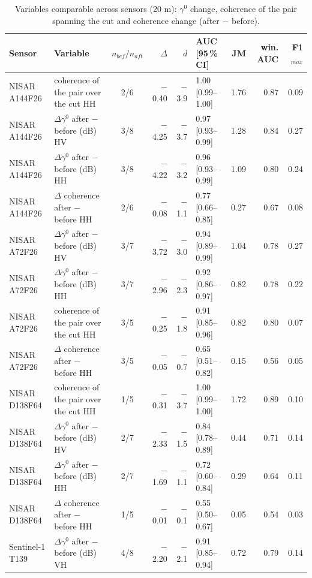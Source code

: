 \begin{table}[htbp]
\centering
\scriptsize
\caption{Variables comparable across sensors (20 m): $\gamma^0$ change, coherence of the pair spanning the cut and coherence change (after $-$ before).}
\label{tab-core}
\begin{tabular}{llcrrlrrr}
\toprule
Sensor & Variable & $n_{bef}/n_{aft}$ & $\Delta$ & $d$ & AUC [95\,\% CI] & JM & win. AUC & F1$_{max}$ \\
\midrule
NISAR A144F26 & coherence of the pair over the cut HH & 2/6 & $-$0.40 & $-$3.9 & 1.00 [0.99--1.00] & 1.76 & 0.87 & 0.09 \\
NISAR A144F26 & $\Delta\gamma^0$ after $-$ before (dB) HV & 3/8 & $-$4.25 & $-$3.7 & 0.97 [0.93--0.99] & 1.28 & 0.84 & 0.27 \\
NISAR A144F26 & $\Delta\gamma^0$ after $-$ before (dB) HH & 3/8 & $-$4.22 & $-$3.2 & 0.96 [0.93--0.99] & 1.09 & 0.80 & 0.24 \\
NISAR A144F26 & $\Delta$ coherence after $-$ before HH & 2/6 & $-$0.08 & $-$1.1 & 0.77 [0.66--0.85] & 0.27 & 0.67 & 0.08 \\
\addlinespace
NISAR A72F26 & $\Delta\gamma^0$ after $-$ before (dB) HV & 3/7 & $-$3.72 & $-$3.0 & 0.94 [0.89--0.99] & 1.04 & 0.78 & 0.27 \\
NISAR A72F26 & $\Delta\gamma^0$ after $-$ before (dB) HH & 3/7 & $-$2.96 & $-$2.3 & 0.92 [0.86--0.97] & 0.82 & 0.78 & 0.22 \\
NISAR A72F26 & coherence of the pair over the cut HH & 3/5 & $-$0.25 & $-$1.8 & 0.91 [0.85--0.96] & 0.82 & 0.80 & 0.07 \\
NISAR A72F26 & $\Delta$ coherence after $-$ before HH & 3/5 & $-$0.05 & $-$0.7 & 0.65 [0.51--0.82] & 0.15 & 0.56 & 0.05 \\
\addlinespace
NISAR D138F64 & coherence of the pair over the cut HH & 1/5 & $-$0.31 & $-$3.7 & 1.00 [0.99--1.00] & 1.72 & 0.89 & 0.10 \\
NISAR D138F64 & $\Delta\gamma^0$ after $-$ before (dB) HV & 2/7 & $-$2.33 & $-$1.5 & 0.84 [0.78--0.89] & 0.44 & 0.71 & 0.14 \\
NISAR D138F64 & $\Delta\gamma^0$ after $-$ before (dB) HH & 2/7 & $-$1.69 & $-$1.1 & 0.72 [0.60--0.84] & 0.29 & 0.64 & 0.11 \\
NISAR D138F64 & $\Delta$ coherence after $-$ before HH & 1/5 & $-$0.01 & $-$0.1 & 0.55 [0.50--0.67] & 0.05 & 0.54 & 0.03 \\
\addlinespace
Sentinel-1 T139 & $\Delta\gamma^0$ after $-$ before (dB) VH & 4/8 & $-$2.20 & $-$2.1 & 0.91 [0.85--0.94] & 0.72 & 0.79 & 0.14 \\

\end{tabular}
\end{table}
